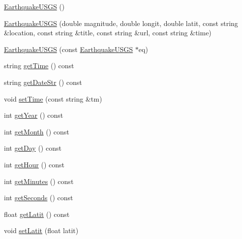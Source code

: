 \begin{DoxyCompactItemize}
\item 
\mbox{\hyperlink{classbridges_1_1_earthquake_u_s_g_s_a540ae74c248da179fbbd182b843a14e0}{Earthquake\+U\+S\+GS}} ()
\item 
\mbox{\hyperlink{classbridges_1_1_earthquake_u_s_g_s_aaa8b6776e6767cf327cebbd371b2c2d0}{Earthquake\+U\+S\+GS}} (double magnitude, double longit, double latit, const string \&location, const string \&title, const string \&url, const string \&time)
\item 
\mbox{\hyperlink{classbridges_1_1_earthquake_u_s_g_s_a450f9683a698be7448ec44c06e456de0}{Earthquake\+U\+S\+GS}} (const \mbox{\hyperlink{classbridges_1_1_earthquake_u_s_g_s}{Earthquake\+U\+S\+GS}} $\ast$eq)
\item 
string \mbox{\hyperlink{classbridges_1_1_earthquake_u_s_g_s_aecadf17367e4227d1d076ee8e38b94ac}{get\+Time}} () const
\item 
string \mbox{\hyperlink{classbridges_1_1_earthquake_u_s_g_s_aab363bb9bca807976bc6e919e5823faf}{get\+Date\+Str}} () const
\item 
void \mbox{\hyperlink{classbridges_1_1_earthquake_u_s_g_s_ad41157360c377050a74c0aeb76098855}{set\+Time}} (const string \&tm)
\item 
int \mbox{\hyperlink{classbridges_1_1_earthquake_u_s_g_s_adb7b780eee3a8ac5907dd40e0a858eaf}{get\+Year}} () const
\item 
int \mbox{\hyperlink{classbridges_1_1_earthquake_u_s_g_s_a9367d4cf0135f850df4398e6e4be3192}{get\+Month}} () const
\item 
int \mbox{\hyperlink{classbridges_1_1_earthquake_u_s_g_s_a7636fbd112eac00faffccfe852d28198}{get\+Day}} () const
\item 
int \mbox{\hyperlink{classbridges_1_1_earthquake_u_s_g_s_ab6004a00f3eab05add3086c56ef62348}{get\+Hour}} () const
\item 
int \mbox{\hyperlink{classbridges_1_1_earthquake_u_s_g_s_a720ed6a608338fa722e03fd489ea4990}{get\+Minutes}} () const
\item 
int \mbox{\hyperlink{classbridges_1_1_earthquake_u_s_g_s_a92e8f541ed8287cc04ec4c5321e3c374}{get\+Seconds}} () const
\item 
float \mbox{\hyperlink{classbridges_1_1_earthquake_u_s_g_s_aa781db898db1e1952820a5d80e8cc493}{get\+Latit}} () const
\item 
void \mbox{\hyperlink{classbridges_1_1_earthquake_u_s_g_s_a143678bb9dd697f82dcb260ddab78f82}{set\+Latit}} (float latit)
\item 

\end{DoxyCompactItemize}
